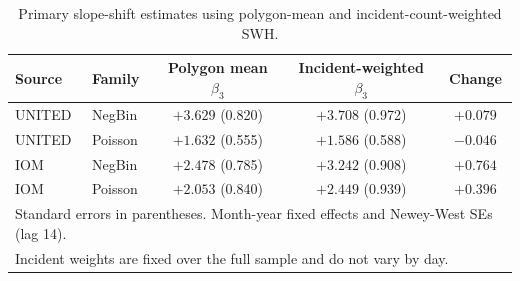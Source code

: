 \begin{table}[h!]
\centering
\small
\caption{Primary slope-shift estimates using polygon-mean and incident-count-weighted SWH.}
\label{tab:appx-swh-weighted}
\begin{tabular}{llccc}
\hline
Source & Family & Polygon mean $\beta_3$ & Incident-weighted $\beta_3$ & Change \\
\hline
UNITED  & NegBin   & $+3.629$ (0.820)    & $+3.708$ (0.972)    & $+0.079$ \\
UNITED  & Poisson  & $+1.632$ (0.555)    & $+1.586$ (0.588)    & $-0.046$ \\
IOM     & NegBin   & $+2.478$ (0.785)    & $+3.242$ (0.908)    & $+0.764$ \\
IOM     & Poisson  & $+2.053$ (0.840)    & $+2.449$ (0.939)    & $+0.396$ \\
\hline
\multicolumn{5}{l}{\footnotesize Standard errors in parentheses. Month-year fixed effects and Newey-West SEs (lag 14).} \\
\multicolumn{5}{l}{\footnotesize Incident weights are fixed over the full sample and do not vary by day.}
\end{tabular}
\end{table}
